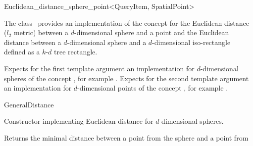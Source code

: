 

\begin{ccRefClass}{Euclidean_distance_sphere_point<QueryItem, SpatialPoint>}  %


\ccDefinition
  
The class \ccRefName\ provides an implementation of 
the  concept
for the Euclidean distance ($l_2$ metric) between a $d$-dimensional sphere and a point and 
the Euclidean distance between a $d$-dimensional sphere
and a $d$-dimensional iso-rectangle defined as a $k$-$d$ tree rectangle.


\ccParameters

Expects for the first template argument an implementation 
for $d$-dimensional spheres of the concept ,
for example .
Expects for the second template argument
an implementation for
$d$-dimensional points of
the concept , 
for example .

\ccIsModel

GeneralDistance

\ccTypes


\ccCreation
{}  %


{Constructor implementing Euclidean distance for
$d$-dimensional spheres.}

\ccOperations


{Returns the minimal distance between a point from the sphere  and a point from
}


\end{ccRefClass}
